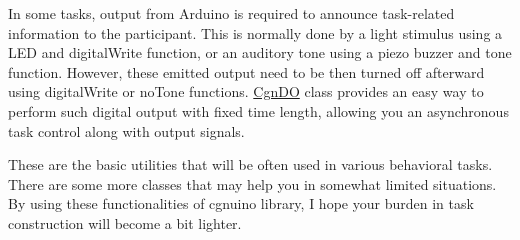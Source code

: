 In some tasks, output from Arduino is required to announce task-\/related information to the participant. This is normally done by a light stimulus using a L\+ED and {\ttfamily digital\+Write} function, or an auditory tone using a piezo buzzer and {\ttfamily tone} function. However, these emitted output need to be then turned off afterward using {\ttfamily digital\+Write} or {\ttfamily no\+Tone} functions. \hyperlink{classCgnDO}{Cgn\+DO} class provides an easy way to perform such digital output with fixed time length, allowing you an asynchronous task control along with output signals.

These are the basic utilities that will be often used in various behavioral tasks. There are some more classes that may help you in somewhat limited situations. By using these functionalities of cgnuino library, I hope your burden in task construction will become a bit lighter. 